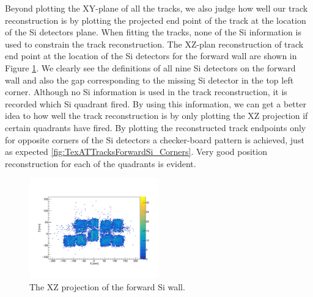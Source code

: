\documentclass[final,number,sort&compress,5p,times,twocolumn]{elsarticle}
\begin{document}
Beyond plotting the XY-plane of all the tracks, we also judge how well our track reconstruction is by plotting the projected end point of the track at the location of the Si detectors plane. When fitting the tracks, none of the Si information is used to constrain the track reconstruction. The XZ-plan reconstruction of track end point at the location of the Si detectors for the forward wall are shown in Figure \ref{fig:TexATTracksForwardSi}. We clearly see the definitions of all nine Si detectors on the forward wall and also the gap corresponding to the missing Si detector in the top left corner. Although no Si information is used in the track reconstruction, it is recorded which Si quadrant fired. By using this information, we can get a better idea to how well the track reconstruction is by only plotting the XZ projection if certain quadrants have fired. By plotting the reconstructed track endpoints only for opposite corners of the Si detectors a checker-board pattern is achieved, just as expected \ref{fig:TexATTracksForwardSi_Corners}. Very good position reconstruction for each of the quadrants is evident.

\begin{figure}[hbt!]
	\centering
	\includegraphics[width=0.5\textwidth]{figures/TexATTracksForwardSi}
    \caption{The XZ projection of the forward Si wall.}
    \label{fig:TexATTracksForwardSi}
\end{figure}
\end{document}
